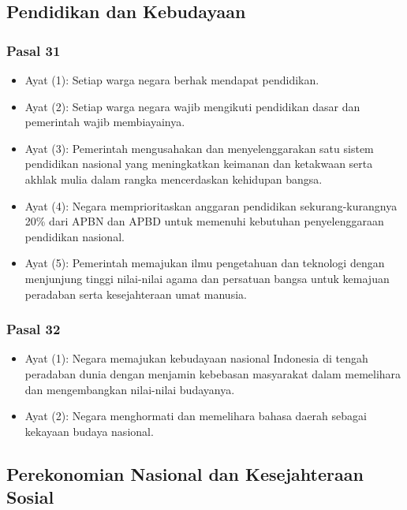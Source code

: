 \subsection{Pendidikan dan Kebudayaan}

\subsubsection{Pasal 31}
\begin{itemize}
\item Ayat (1): Setiap warga negara berhak mendapat pendidikan.
\item Ayat (2): Setiap warga negara wajib mengikuti pendidikan dasar dan pemerintah wajib membiayainya.
\item Ayat (3): Pemerintah mengusahakan dan menyelenggarakan satu sistem pendidikan nasional yang meningkatkan keimanan dan ketakwaan serta akhlak mulia dalam rangka mencerdaskan kehidupan bangsa.
\item Ayat (4): Negara memprioritaskan anggaran pendidikan sekurang-kurangnya 20\% dari APBN dan APBD untuk memenuhi kebutuhan penyelenggaraan pendidikan nasional.
\item Ayat (5): Pemerintah memajukan ilmu pengetahuan dan teknologi dengan menjunjung tinggi nilai-nilai agama dan persatuan bangsa untuk kemajuan peradaban serta kesejahteraan umat manusia.
\end{itemize}

\subsubsection{Pasal 32}
\begin{itemize}
\item Ayat (1): Negara memajukan kebudayaan nasional Indonesia di tengah peradaban dunia dengan menjamin kebebasan masyarakat dalam memelihara dan mengembangkan nilai-nilai budayanya.
\item Ayat (2): Negara menghormati dan memelihara bahasa daerah sebagai kekayaan budaya nasional.
\end{itemize}

\subsection{Perekonomian Nasional dan Kesejahteraan Sosial}

